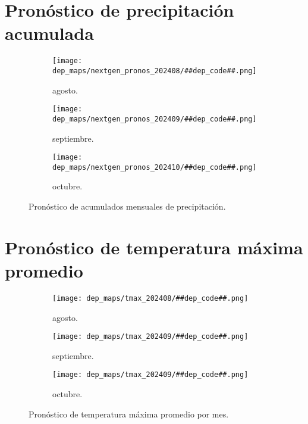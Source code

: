 \pagebreak

\section*{Pronóstico de precipitación acumulada}
\begin{figure}[H]
    \centering
    \begin{subfigure}{0.45\linewidth}
        \centering
        \texttt{[image: dep\_maps/nextgen\_pronos\_202408/\#\#dep\_code\#\#.png]}
        \caption{agosto.}
    \end{subfigure}
    \begin{subfigure}{0.45\linewidth}
        \centering
        \texttt{[image: dep\_maps/nextgen\_pronos\_202409/\#\#dep\_code\#\#.png]}
        \caption{septiembre.}
    \end{subfigure}
    \begin{subfigure}{0.45\linewidth}
        \centering
        \texttt{[image: dep\_maps/nextgen\_pronos\_202410/\#\#dep\_code\#\#.png]}
        \caption{octubre.}
    \end{subfigure}
    \caption{Pronóstico de acumulados mensuales de precipitación.}
\end{figure}

\pagebreak

\section*{Pronóstico de temperatura máxima promedio}
\begin{figure}[H]
    \centering
    \begin{subfigure}{0.45\linewidth}
        \centering
        \texttt{[image: dep\_maps/tmax\_202408/\#\#dep\_code\#\#.png]}
        \caption{agosto.}
    \end{subfigure}
    \begin{subfigure}{0.45\linewidth}
        \centering
        \texttt{[image: dep\_maps/tmax\_202409/\#\#dep\_code\#\#.png]}
        \caption{septiembre.}
    \end{subfigure}
    \begin{subfigure}{0.45\linewidth}
        \centering
        \texttt{[image: dep\_maps/tmax\_202409/\#\#dep\_code\#\#.png]}
        \caption{octubre.}
    \end{subfigure}
    \caption{Pronóstico de temperatura máxima promedio por mes.}
\end{figure}
